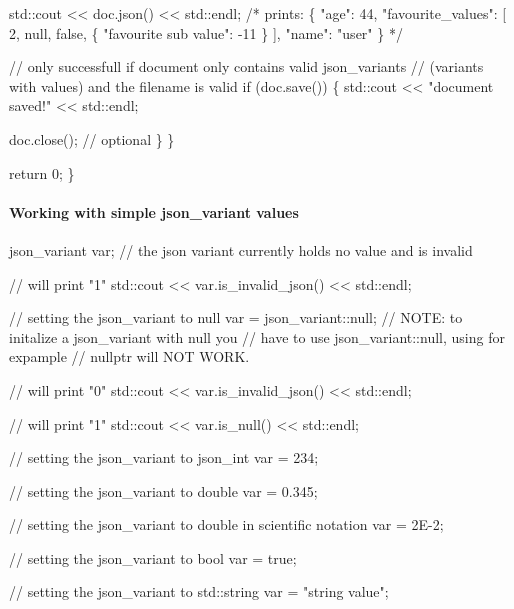 \begin{DoxyCode}
        std::cout << doc.json() << std::endl;
        \textcolor{comment}{/*}
\textcolor{comment}{        prints:}
\textcolor{comment}{        \{}
\textcolor{comment}{            "age": 44,}
\textcolor{comment}{            "favourite\_values": [}
\textcolor{comment}{                2,}
\textcolor{comment}{                null,}
\textcolor{comment}{                false,}
\textcolor{comment}{                \{}
\textcolor{comment}{                    "favourite sub value": -11}
\textcolor{comment}{                \}}
\textcolor{comment}{            ],}
\textcolor{comment}{            "name": "user"}
\textcolor{comment}{        \}}
\textcolor{comment}{        */}

        \textcolor{comment}{// only successfull if document only contains valid json\_variants}
        \textcolor{comment}{// (variants with values) and the filename is valid}
        \textcolor{keywordflow}{if} (doc.save()) \{ 
            std::cout << \textcolor{stringliteral}{"document saved!"} << std::endl;

            doc.close(); \textcolor{comment}{// optional}
        \}
    \}

    \textcolor{keywordflow}{return} 0;
\}
\end{DoxyCode}


\paragraph*{\label{_working_with_simple_section}%
Working with simple json\+\_\+variant values}


\begin{DoxyCode}
json\_variant var;           \textcolor{comment}{// the json variant currently holds no value and is invalid}

\textcolor{comment}{// will print "1"}
std::cout << var.is\_invalid\_json() << std::endl;    

\textcolor{comment}{// setting the json\_variant to null}
var = json\_variant::null;
\textcolor{comment}{// NOTE: to initalize a json\_variant with null you }
\textcolor{comment}{// have to use json\_variant::null, using for expample }
\textcolor{comment}{// nullptr will NOT WORK.}

\textcolor{comment}{// will print "0"}
std::cout << var.is\_invalid\_json() << std::endl;

\textcolor{comment}{// will print "1"}
std::cout << var.is\_null() << std::endl;

\textcolor{comment}{// setting the json\_variant to json\_int}
var = 234;

\textcolor{comment}{// setting the json\_variant to double}
var = 0.345;

\textcolor{comment}{// setting the json\_variant to double in scientific notation}
var = 2E-2;

\textcolor{comment}{// setting the json\_variant to bool}
var = \textcolor{keyword}{true};

\textcolor{comment}{// setting the json\_variant to std::string}
var = \textcolor{stringliteral}{"string value"};       
\end{DoxyCode}



